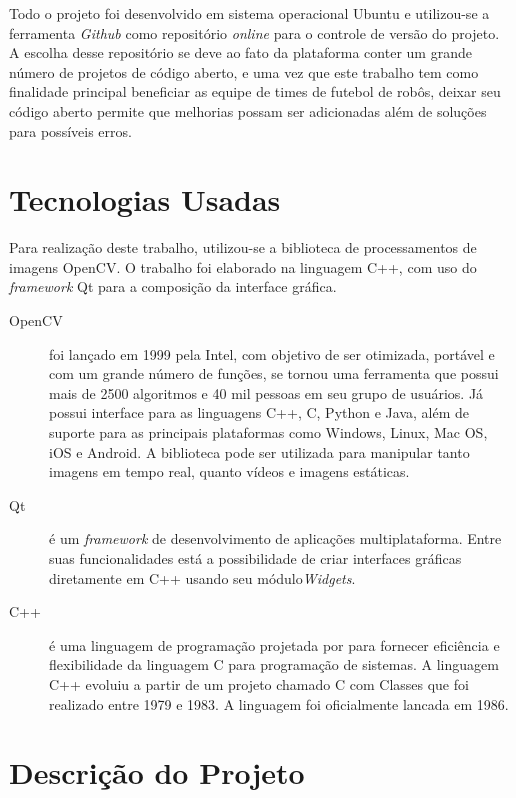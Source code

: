 	Todo o projeto foi desenvolvido em sistema operacional Ubuntu e utilizou-se a ferramenta {\it Github} como repositório {\it online} para o controle de versão do projeto. A escolha desse repositório se deve ao fato da plataforma conter um grande número de projetos de código aberto, e uma vez que este trabalho tem como finalidade principal beneficiar as equipe de times de futebol de robôs, deixar seu código aberto permite que melhorias possam ser adicionadas além de soluções para possíveis erros.
			
\section{Tecnologias Usadas}
Para realização deste trabalho,  utilizou-se a biblioteca de processamentos de imagens OpenCV. O trabalho foi elaborado na linguagem C++, com uso do {\it framework} Qt para a composição da interface gráfica.
 
\begin{description}
	\item[OpenCV] foi lançado em 1999 pela Intel\cite{Culjak:2012}, com objetivo de ser otimizada, portável e com um grande número de funções, se tornou uma ferramenta que possui mais de 2500 algoritmos e 40 mil pessoas em seu grupo de usuários\cite{Culjak:2012}. Já possui interface para as linguagens C++, C, Python e Java, além de suporte para as principais plataformas como Windows, Linux, Mac OS, iOS e Android. A biblioteca pode ser utilizada para manipular tanto imagens em tempo real, quanto vídeos e imagens estáticas.
	
	\item[Qt] é um {\it framework} de desenvolvimento de aplicações multiplataforma. Entre suas funcionalidades está a possibilidade de criar interfaces gráficas diretamente em C++ usando seu módulo{\it  Widgets}.
	
	\item [C++] é uma linguagem de programação projetada por  para fornecer eficiência e flexibilidade da linguagem C para programação de sistemas. A linguagem C++ evoluiu a partir de um projeto chamado C com Classes que foi realizado  entre 1979 e 1983. A linguagem foi oficialmente lancada em 1986.
\end{description}

\section{Descrição do Projeto}
